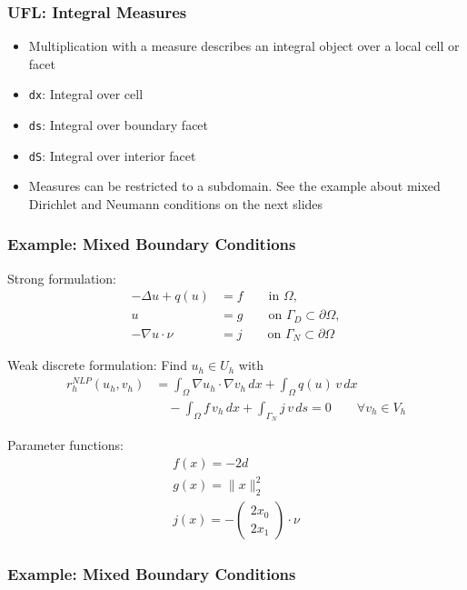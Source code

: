 \documentclass[aspectratio=169,11pt]{beamer}
\theoremstyle{definition}
\begin{document}
\begin{frame}[fragile]
  \frametitle{UFL: Integral Measures}
  \begin{itemize}
  \item Multiplication with a measure describes an integral object over a local
    cell or facet
  \item \lstinline{dx}: Integral over cell
  \item \lstinline{ds}: Integral over boundary facet
  \item \lstinline{dS}: Integral over interior facet
  \item Measures can be restricted to a subdomain. See the example about mixed
    Dirichlet and Neumann conditions on the next slides
  \end{itemize}
\end{frame}

\begin{frame}
  \frametitle{Example: Mixed Boundary Conditions}

  Strong formulation:
  \begin{align*}
    -\Delta u + q(u) & = f \qquad\text{in $\Omega$}, \\
    u &= g \qquad\text{on $\Gamma_D\subset\partial\Omega$}, \\
    -\nabla u \cdot \nu &= j \qquad\text{on $\Gamma_N\subset\partial\Omega$}
  \end{align*}

  Weak discrete formulation: Find $u_h \in U_h$ with
  \begin{align*}
    r_h^{NLP}(u_h, v_h)
    & = \int_\Omega \nabla u_h \cdot \nabla v_h \, dx
      + \int_\Omega q(u) \, v \, dx \\
    &\quad - \int_\Omega f \, v_h \, dx
      + \int_{\Gamma_N} j \, v \, ds
      = 0 \qquad \forall v_h \in V_h
  \end{align*}

  Parameter functions:
  \begin{align*}
    f(x) = -2d \\
    g(x) = \| x \|_2^2\\
    j(x) = -
    \begin{pmatrix}
      2x_0 \\ 2x_1
    \end{pmatrix}
    \cdot \nu
  \end{align*}
\end{frame}

\begin{frame}
  \frametitle{Example: Mixed Boundary Conditions}
  
\end{frame}
\end{document}
